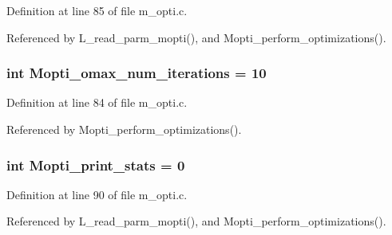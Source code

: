 Definition at line 85 of file m\_\-opti.c.

Referenced by L\_\-read\_\-parm\_\-mopti(), and Mopti\_\-perform\_\-optimizations().
\subsubsection{\setlength{\rightskip}{0pt plus 5cm}int \bf{Mopti\_\-omax\_\-num\_\-iterations} = 10}\label{m__opti_8c_21ee65d19bde03d2895d275deef3f39c}




Definition at line 84 of file m\_\-opti.c.

Referenced by Mopti\_\-perform\_\-optimizations().
\subsubsection{\setlength{\rightskip}{0pt plus 5cm}int \bf{Mopti\_\-print\_\-stats} = 0}\label{m__opti_8c_8b2b3e7d98bd625d28e844932802ef08}




Definition at line 90 of file m\_\-opti.c.

Referenced by L\_\-read\_\-parm\_\-mopti(), and Mopti\_\-perform\_\-optimizations().